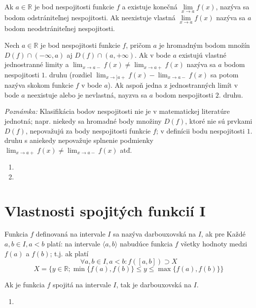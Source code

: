 Ak $a \in \mathbb{R}$ je bod nespojitosti funkcie $f$ a existuje konečná
$\lim\limits_{x \rightarrow a}f(x)$, nazýva sa bodom odstrániteľnej nespojitosti. Ak
neexistuje vlastná $\lim\limits_{x \rightarrow a}f(x)$ nazýva sa $a$ bodom
neodstrániteľnej nespojitosti.

Nech $a \in \mathbb{R}$ je bod nespojitosti funkcie $f$, pričom $a$ je hromadným bodom množín $D(f) \cap (-\infty,a)$ aj $D(f)\cap (a,+\infty)$. Ak v bode $a$ existujú vlastné jednostranné limity a $\lim_{x \rightarrow a-}f(x) \neq \lim_{x \rightarrow a+}f(x)$ nazýva sa $a$ bodom nespojitosti $1.$ druhu (rozdiel $\lim_{x \rightarrow] a+}f(x)-\lim_{x \rightarrow a-}f(x)$ sa potom nazýva skokom funkcie $f$ v bode $a$). Ak aspoň jedna z jednostranných limít v bode $a$ neexistuje alebo je nevlastná, nayzva sa $a$ bodom nespojitosti $2.$ druhu.

\textit{Poznámka:}
Klasifikácia bodov nespojitosti nie je v matematickej literatúre jednotná; napr. niekedy sa hromadné body množiny $D(f)$, ktoré nie sú prvkami $D(f)$, nepovažujú za body nespojitosti funkcie $f$; v definícii bodu nespojitosti $1.$ druhu s aniekedy nepovažuje splnenie podmienky $\lim_{x \rightarrow a+}f(x) \neq \lim_{x \rightarrow a-}f(x)$ atď.

\begin{enumerate}[resume]
  \item {}
  \item {}
\end{enumerate}

\section{Vlastnosti spojitých funkcií I}

Funkcia $f$ definovaná na intervale $I$ sa nazýva darbouxovská na $I$, ak pre
Každé $a,b \in I,a<b$ platí: na intervale $\langle a,b \rangle$ nabudúce
funkcia $f$ všetky hodnoty medzi $f(a)$ a $f(b)$; t.j. ak platí
$$
  \forall a, b \in I, a < b:
    f(\left[ a, b \right] ) \supset X
$$
$$
  X = \{y \in \mathbb{R}; \min \{f(a),f(b)\} \leq y \leq \max \{f(a),f(b)\}\}
$$

\begin{veta}
Ak je funkcia $f$ spojitá na intervale $I$, tak je darbouxovská na $I$.
\end{veta}

\begin{enumerate}[resume]
  \item {}
\end{enumerate}

